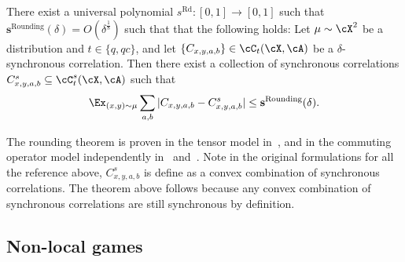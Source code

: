 \begin{theorem} \label{thm:Rounding}
	There exist a universal polynomial $s^{\text{Rd}}: [0,1] \rightarrow [0,1]$ such that $ \textbf{s}^{\text{Rounding}}(\delta) =  O(\delta^{\frac{1}{8}})$ such that that the following holds:
	Let $\mu \sim \cX^2$ be a distribution and $t \in \{q,qc\}$, and let $\{C_{x,y,a,b}\} \in \cC_{t}(\cX, \cA)$ be a $\delta$-synchronous correlation. Then there exist a collection of synchronous correlations $C_{x,y,a,b}^{s}  \subseteq \cC_{t}^{s} (\cX, \cA)$ such that
	\begin{equation*}
		\Ex_{(x,y) \sim \mu} \sum_{a,b}|C_{x,y,a,b} - C_{x,y,a,b}^{s} |  \leq \textbf{s}^{\text{Rounding}}(\delta).
	\end{equation*}
\end{theorem}
The rounding theorem is proven in the tensor model in~\cite[Corollary 3.3]{vidickAlmostSynchronousQuantum2022}, and in the commuting operator model independently in~\cite[Theorem 4.1]{linTracialEmbeddableStrategies2024} and~\cite[Theorem 2.1]{delasalleAlmostSynchronousCorrelations2023}. Note in the original formulations for all the reference above, $C_{x,y,a,b}^{s}$ is define as a convex combination of synchronous correlations. The theorem above follows because any convex combination of synchronous correlations are still synchronous by definition. 


%

\subsection{Non-local games} \label{sec:prenonlocalgames}

